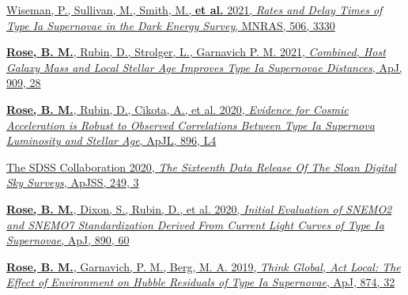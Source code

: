 \documentclass[margin]{res}
\begin{document}
\begin{resume}
\hangindent=15pt 
\href{https://ui.adsabs.harvard.edu/abs/2021MNRAS.tmp.1758W/abstract}{Wiseman, P., Sullivan, M., Smith, M., {\bf et al.} 2021, {\sl Rates and Delay Times of Type Ia Supernovae in the Dark Energy Survey}, MNRAS, 506, 3330} 
\vspace{-12pt}


\hangindent=15pt 
\href{https://ui.adsabs.harvard.edu/abs/2020arXiv201201460R/abstract}{{\bf Rose, B. M.}, Rubin, D., Strolger, L., Garnavich P. M. 2021, {\sl Combined, Host Galaxy Mass and Local Stellar Age Improves Type Ia Supernovae Distances}, ApJ, 909, 28} %
\vspace{-12pt}

\hangindent=15pt 
\href{https://ui.adsabs.harvard.edu/abs/2020ApJ...896L...4R/abstract}{{\bf Rose, B. M.}, Rubin, D., Cikota, A., et al. 2020, {\sl Evidence for Cosmic Acceleration is Robust to Observed Correlations Between Type Ia Supernova Luminosity and Stellar Age}, ApJL, 896, L4}
\vspace{-12pt}

\hangindent=15pt 
\href{https://ui.adsabs.harvard.edu/abs/2020ApJS..249....3A/abstract}{The SDSS Collaboration 2020, {\sl The Sixteenth Data Release Of The Sloan Digital Sky Surveys}, ApJSS, 249, 3}
\vspace{-12pt}


\hangindent=15pt
\href{https://ui.adsabs.harvard.edu/#abs/2019arXiv191209993R/abstract}{{\bf Rose, B. M.}, Dixon, S., Rubin, D., et al.  2020, {\sl Initial Evaluation of SNEMO2 and SNEMO7 Standardization Derived From Current Light Curves of Type Ia Supernovae}, ApJ, 890, 60} %
\vspace{-12pt}

\hangindent=15pt 
\href{https://ui.adsabs.harvard.edu/#abs/2019arXiv190201433R/abstract}{{\bf Rose, B. M.}, Garnavich, P. M., Berg, M. A. 2019, {\sl Think Global, Act Local: The Effect of Environment on Hubble Residuals of Type Ia Supernovae}, ApJ, 874, 32}
\vspace{-12pt}


\end{resume}
\end{document}
